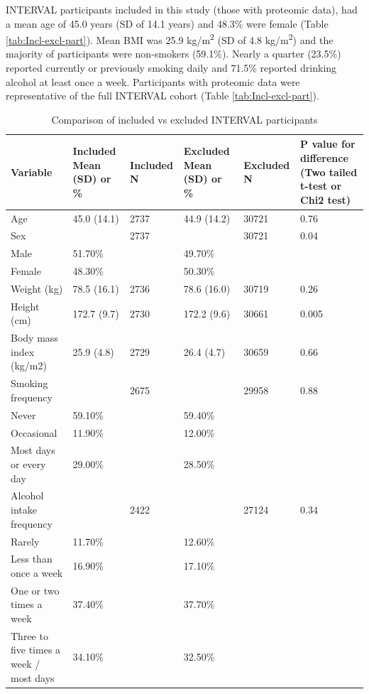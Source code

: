 \documentclass[11pt,twoside]{bristolthesis}
\begin{document}
INTERVAL participants included in this study (those with proteomic data), had a mean age of 45.0 years (SD of 14.1 years) and 48.3\% were female (Table \ref{tab:Incl-excl-part}). Mean BMI was 25.9 kg/m\textsuperscript{2} (SD of 4.8 kg/m\textsuperscript{2}) and the majority of participants were non-smokers (59.1\%). Nearly a quarter (23.5\%) reported currently or previously smoking daily and 71.5\% reported drinking alcohol at least once a week. Participants with proteomic data were representative of the full INTERVAL cohort (Table \ref{tab:Incl-excl-part}).
\begin{landscape}\begin{table}

\caption{\label{tab:Inc-excl-part}Comparison of included vs excluded INTERVAL participants}
\centering
\begin{tabu} to 
\toprule
Variable & Included Mean (SD) or \% & Included N & Excluded Mean (SD) or \% & Excluded N & P value for difference (Two tailed t-test or Chi2 test)\\
\midrule
Age & 45.0 (14.1) & 2737 & 44.9 (14.2) & 30721 & 0.76\\
Sex &  & 2737 &  & 30721 & 0.04\\
\hspace{1em}Male & 51.70\% &  & 49.70\% &  & \\
\hspace{1em}Female & 48.30\% &  & 50.30\% &  & \\
Weight (kg) & 78.5 (16.1) & 2736 & 78.6 (16.0) & 30719 & 0.26\\
\addlinespace
Height (cm) & 172.7 (9.7) & 2730 & 172.2 (9.6) & 30661 & 0.005\\
Body mass index (kg/m2) & 25.9 (4.8) & 2729 & 26.4 (4.7) & 30659 & 0.66\\
Smoking frequency &  & 2675 &  & 29958 & 0.88\\
\hspace{1em}Never & 59.10\% &  & 59.40\% &  & \\
\hspace{1em}Occasional & 11.90\% &  & 12.00\% &  & \\
\addlinespace
\hspace{1em}Most days or every day & 29.00\% &  & 28.50\% &  & \\
Alcohol intake frequency &  & 2422 &  & 27124 & 0.34\\
\hspace{1em}Rarely & 11.70\% &  & 12.60\% &  & \\
\hspace{1em}Less than once a week & 16.90\% &  & 17.10\% &  & \\
\hspace{1em}One or two times a week & 37.40\% &  & 37.70\% &  & \\
\addlinespace
\hspace{1em}Three to five times a week / most days & 34.10\% &  & 32.50\% &  & \\
\bottomrule
\end{tabu}
\end{table}
\end{landscape}
\end{document}
